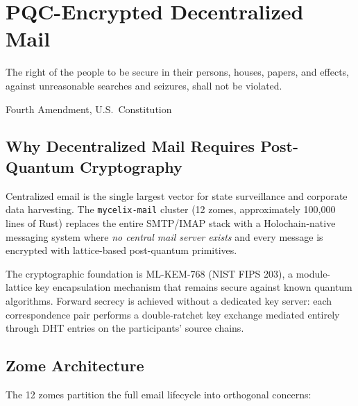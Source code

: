 \documentclass[12pt]{book}
\begin{document}
\chapter{PQC-Encrypted Decentralized Mail}
\label{ch:mail}

\epigraph{The right of the people to be secure in their persons, houses, papers,
and effects, against unreasonable searches and seizures, shall not be
violated.}{Fourth Amendment, U.S.\ Constitution}

\section{Why Decentralized Mail Requires Post-Quantum Cryptography}

Centralized email is the single largest vector for state surveillance and
corporate data harvesting.  The \texttt{mycelix-mail} cluster (12 zomes,
approximately 100,000 lines of Rust) replaces the entire SMTP/IMAP stack
with a Holochain-native messaging system where \emph{no central mail server
exists} and every message is encrypted with lattice-based post-quantum
primitives.

The cryptographic foundation is ML-KEM-768 (NIST FIPS 203), a module-lattice
key encapsulation mechanism that remains secure against known quantum
algorithms.  Forward secrecy is achieved without a dedicated key server:
each correspondence pair performs a double-ratchet key exchange mediated
entirely through DHT entries on the participants' source chains.

\section{Zome Architecture}

The 12 zomes partition the full email lifecycle into orthogonal concerns:
\end{document}
